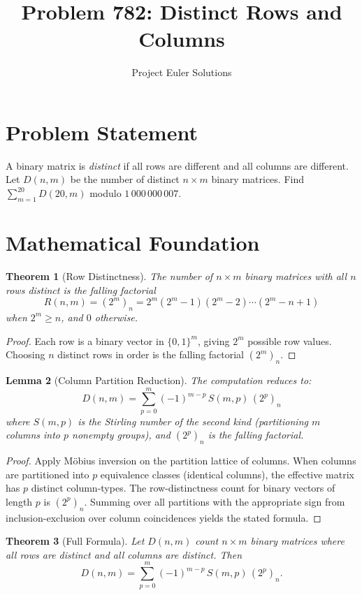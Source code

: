 \documentclass[11pt]{article}
\title{Problem 782: Distinct Rows and Columns}
\author{Project Euler Solutions}
\date{}
\newtheorem{theorem}{Theorem}
\newtheorem{lemma}[theorem]{Lemma}
\begin{document}
\maketitle

\section{Problem Statement}
A binary matrix is \emph{distinct} if all rows are different and all columns are different. Let $D(n,m)$ be the number of distinct $n \times m$ binary matrices. Find $\sum_{m=1}^{20} D(20, m)$ modulo $1\,000\,000\,007$.

\section{Mathematical Foundation}

\begin{theorem}[Row Distinctness]
The number of $n \times m$ binary matrices with all $n$ rows distinct is the falling factorial
\[
R(n,m) = (2^m)_n = 2^m(2^m - 1)(2^m - 2)\cdots(2^m - n + 1)
\]
when $2^m \ge n$, and $0$ otherwise.
\end{theorem}

\begin{proof}
Each row is a binary vector in $\{0,1\}^m$, giving $2^m$ possible row values. Choosing $n$ distinct rows in order is the falling factorial $(2^m)_n$.
\end{proof}

\begin{lemma}[Column Partition Reduction]
The computation reduces to:
\[
D(n,m) = \sum_{p=0}^{m} (-1)^{m-p}\, S(m,p)\, (2^p)_n
\]
where $S(m,p)$ is the Stirling number of the second kind (partitioning $m$ columns into $p$ nonempty groups), and $(2^p)_n$ is the falling factorial.
\end{lemma}

\begin{proof}
Apply M\"obius inversion on the partition lattice of columns. When columns are partitioned into $p$ equivalence classes (identical columns), the effective matrix has $p$ distinct column-types. The row-distinctness count for binary vectors of length $p$ is $(2^p)_n$. Summing over all partitions with the appropriate sign from inclusion-exclusion over column coincidences yields the stated formula.
\end{proof}

\begin{theorem}[Full Formula]
Let $D(n,m)$ count $n \times m$ binary matrices where all rows are distinct and all columns are distinct. Then
\[
D(n,m) = \sum_{p=0}^{m} (-1)^{m-p}\, S(m,p)\, (2^p)_n.
\]
\end{theorem}
\end{document}
